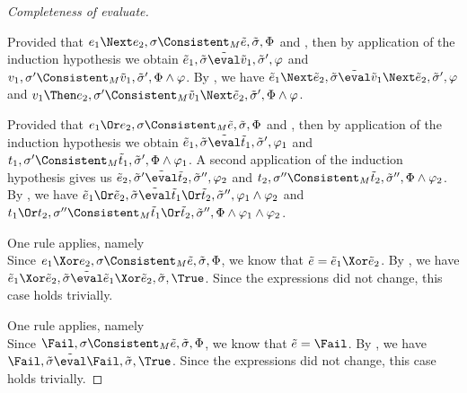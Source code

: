 \begin{proof}[Completeness of evaluate]
{    }

    {
    Provided that $e_1\Next e_2,\sigma\Consistent_M \tilde{e},\tilde{\sigma},\Phi$ and ,
    then by application of the induction hypothesis we obtain $\tilde{e}_1,\tilde{\sigma}\tilde{\eval}\tilde{v}_1,\tilde{\sigma}',\phi$
    and $v_1,\sigma'\Consistent_M \tilde{v}_1,\tilde{\sigma}',\Phi\land\phi$.
    By , we have $\tilde{e}_1\Next \tilde{e}_2,\tilde{\sigma}\tilde{\eval}\tilde{v}_1\Next\tilde{e}_2,\tilde{\sigma}',\phi$ and $v_1\Then e_2 ,\sigma'\Consistent_M \tilde{v}_1\Next\tilde{e}_2 ,\tilde{\sigma}',\Phi\land\phi$.

    }

    {
    Provided that $e_1\Or e_2,\sigma\Consistent_M \tilde{e},\tilde{\sigma},\Phi$ and ,
    then by application of the induction hypothesis we obtain $\tilde{e}_1,\tilde{\sigma}\tilde{\eval}\tilde{t}_1,\tilde{\sigma}',\phi_1$
    and $t_1,\sigma'\Consistent_M \tilde{t}_1,\tilde{\sigma}',\Phi\land\phi_1$.
    A second application of the induction hypothesis gives us  $\tilde{e}_2,\tilde{\sigma}'\tilde{\eval}\tilde{t}_2,\tilde{\sigma}'',\phi_2$
    and $t_2,\sigma''\Consistent_M \tilde{t}_2,\tilde{\sigma}'',\Phi\land\phi_2$.
    By , we have $\tilde{e}_1\Or \tilde{e}_2,\tilde{\sigma}\tilde{\eval}\tilde{t}_1\Or\tilde{t}_2,\tilde{\sigma}'',\phi_1\land\phi_2$ and $t_1\Or t_2 ,\sigma''\Consistent_M \tilde{t}_1\Or\tilde{t}_2 ,\tilde{\sigma}'',\Phi\land\phi_1\land\phi_2$.

    }

    {  One rule applies, namely \\
    Since $e_1\Xor e_2,\sigma\Consistent_M \tilde{e},\tilde{\sigma},\Phi$, we know that $\tilde{e}=\tilde{e}_1\Xor \tilde{e}_2$.
    By , we have $\tilde{e}_1\Xor \tilde{e}_2,\tilde{\sigma}\tilde{\eval}\tilde{e}_1\Xor \tilde{e}_2,\tilde{\sigma},\True$.
    Since the expressions did not change, this case holds trivially.

    }

    {  One rule applies, namely \\
    Since $\Fail,\sigma\Consistent_M \tilde{e},\tilde{\sigma},\Phi$, we know that $\tilde{e}=\Fail$.
    By , we have $\Fail,\tilde{\sigma}\tilde{\eval}\Fail,\tilde{\sigma},\True$.
    Since the expressions did not change, this case holds trivially.


    }
\end{proof}
